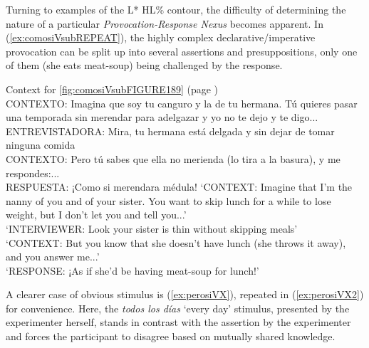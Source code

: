 Turning to examples of the L* HL\% contour, the difficulty of determining the nature of a particular \textit{Provocation-Response Nexus} becomes apparent. In (\ref{ex:comosiVsubREPEAT}), the highly complex declarative/imperative provocation can be split up into several assertions and presuppositions, only one of them (she eats meat-soup) being challenged by the response.

\begin{exe}
	\ex  \label{ex:comosiVsubREPEAT} Context for \autoref{fig:comosiVsubFIGURE189} (page \pageref{fig:comosiVsubFIGURE189})\\
	CONTEXTO: Imagina que soy tu canguro y la de tu hermana. Tú quieres pasar
	una temporada sin merendar para adelgazar y yo no te dejo y te digo...\\
	ENTREVISTADORA: Mira, tu hermana está delgada y sin dejar de tomar ninguna comida \\
	CONTEXTO: Pero tú sabes que ella no merienda (lo tira a la basura), y me respondes:... \\
	RESPUESTA: ¡Como si merendara médula!
	\glt `CONTEXT: Imagine that I'm the nanny of you and of your sister. You want to skip lunch for a while to lose weight, but I don't let you and tell you...'\\
    `INTERVIEWER: Look your sister is thin without skipping meals' \\
    `CONTEXT: But you know that she doesn't have lunch (she throws it away), and you answer me...' \\
	`RESPONSE: ¡As if she'd be having meat-soup for lunch!'
\end{exe}

A clearer case of obvious stimulus is (\ref{ex:perosiVX}), repeated in (\ref{ex:perosiVX2}) for convenience. Here, the \textit{todos los días} `every day' stimulus, presented by the experimenter herself, stands in contrast with the assertion by the experimenter and forces the participant to disagree based on mutually shared knowledge.


